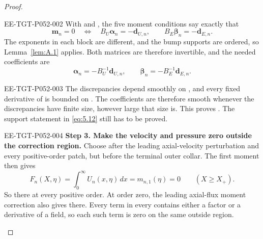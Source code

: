 \begin{proof}
\begin{EESegment}{EE-TGT-P052-002}
With  and
, the five moment conditions
say exactly that
\[
\mathbf m_n=0
\quad\Longleftrightarrow\quad
B_U\boldsymbol\alpha_n=-\mathbf d_{U,n},
\qquad
B_E\boldsymbol\beta_n=-\mathbf d_{E,n}.
\]
The exponents in each block are different, and the bump supports are ordered, so Lemma~\ref{lem:A.1} applies. Both
matrices are therefore invertible, and the needed coefficients are
\begin{equation}\label{eq:5.16}
\boldsymbol\alpha_n=-B_U^{-1}\mathbf d_{U,n},
\qquad
\boldsymbol\beta_n=-B_E^{-1}\mathbf d_{E,n}.
\tag{5.16}
\end{equation}
\end{EESegment}

\begin{EESegment}{EE-TGT-P052-003}
The discrepancies depend smoothly on , and every fixed derivative of
 is bounded on . The coefficients are therefore smooth whenever
the discrepancies have finite size, however large that size is. This proves . The
support statement in \eqref{eq:5.12} still has to be proved.
\end{EESegment}

\begin{EESegment}{EE-TGT-P052-004}
\textbf{Step 3. Make the velocity and pressure zero outside the correction region.}
Choose  after the leading axial-velocity perturbation  and every
positive-order patch, but before the terminal outer collar. The first moment then gives
\[
F_n(X,\eta)=\int_0^\infty U_n(x,\eta)\,dx=m_{n,1}(\eta)=0
\qquad (X\geq X_+).
\]
So  there at every positive order. At order zero, the leading
axial-flux moment correction also gives  there. Every term in every
 contains either a  factor or a derivative of a
 field, so each such term is zero on the same outside region.
\end{EESegment}


\end{proof}
